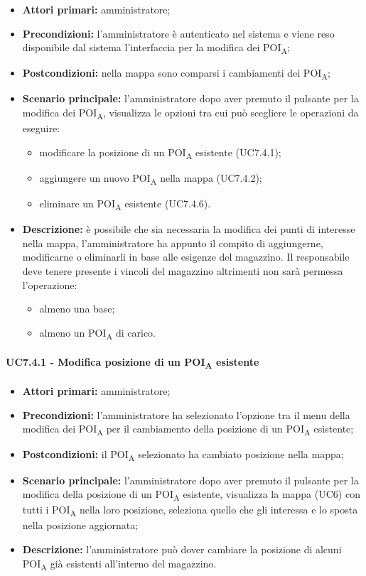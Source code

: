 \begin{itemize}
	\item 	\textbf{Attori primari:} amministratore;
	\item 	\textbf{Precondizioni:} l'amministratore è autenticato nel sistema e viene reso disponibile dal sistema l'interfaccia per la modifica dei POI\textsubscript{A};
	\item 	\textbf{Postcondizioni:} nella mappa sono comparsi i cambiamenti dei POI\textsubscript{A}; 
	\item 	\textbf{Scenario principale:} l'amministratore dopo aver premuto il pulsante per la modifica dei POI\textsubscript{A}, visualizza le opzioni tra cui può scegliere le operazioni da eseguire:
	\begin{itemize}
		\item modificare la posizione di un POI\textsubscript{A} esistente (UC7.4.1);
		\item aggiungere un nuovo POI\textsubscript{A} nella mappa (UC7.4.2);
		\item eliminare un POI\textsubscript{A} esistente (UC7.4.6).
	\end{itemize}
	\item 	\textbf{Descrizione:} è possibile che sia necessaria la modifica dei punti di interesse nella mappa, l'amministratore ha appunto il compito di aggiungerne, modificarne o eliminarli in base alle esigenze del magazzino. Il responsabile deve tenere presente i vincoli del magazzino altrimenti non sarà permessa l'operazione:
	\begin{itemize}
		\item almeno una base;
		\item almeno un POI\textsubscript{A} di carico.
	\end{itemize}
\end{itemize}

\paragraph{UC7.4.1 - Modifica posizione di un POI\textsubscript{A} esistente}

\begin{itemize}
	\item 	\textbf{Attori primari:} amministratore;
	\item 	\textbf{Precondizioni:} l'amministratore ha selezionato l'opzione tra il menu della modifica dei POI\textsubscript{A} per il cambiamento della posizione di un POI\textsubscript{A} esistente;
	\item 	\textbf{Postcondizioni:} il POI\textsubscript{A} selezionato ha cambiato posizione nella mappa; 
	\item 	\textbf{Scenario principale:} l'amministratore dopo aver premuto il pulsante per la modifica della posizione di un POI\textsubscript{A} esistente, visualizza la mappa (UC6) con tutti i POI\textsubscript{A} nella loro posizione, seleziona quello che gli interessa e lo sposta nella posizione aggiornata;
	\item 	\textbf{Descrizione:} l'amministratore può dover cambiare la posizione di alcuni POI\textsubscript{A} già esistenti all'interno del magazzino.
\end{itemize}
